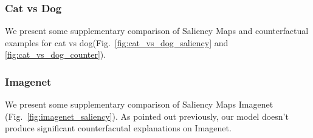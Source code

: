 \subsubsection{Cat vs Dog}
We present some supplementary comparison of Saliency Maps and counterfactual examples for cat vs dog(Fig.~\ref{fig:cat_vs_dog_saliency} and \ref{fig:cat_vs_dog_counter}).

\subsubsection{Imagenet}
We present some supplementary comparison of Saliency Maps Imagenet (Fig.~\ref{fig:imagenet_saliency}). As pointed out previously, our model doesn't produce significant counterfacutal explanations on Imagenet.
